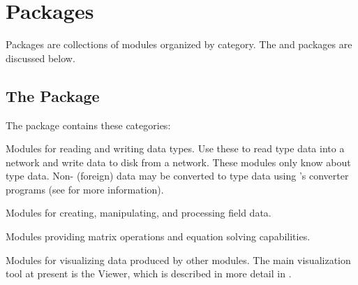 %
%
%
%
%
%

\section{Packages}
\label{sec:packages}

Packages are collections of modules organized by category. The \SR{} and 
packages are discussed below. 

\subsection{The \sr{} Package}
\label{sec:srpackage}


The \sr{} package contains these categories:

\begin{description}
   Modules for reading and writing \sr{}
  data types.  Use these to read \sr{} type data into a network and
  write data to disk from a network.  These modules only know about
  \sr{} type data.  Non-\sr{} (foreign) data may be converted to \sr{}
  type data using \sr{}'s converter programs (see  for more information).
  
   Modules for creating, manipulating, and
  processing field data.
  
   Modules providing matrix operations and
  equation solving capabilities.
  
   Modules for visualizing data produced by
  other modules.  The main visualization tool at present
  is the Viewer, which is described in more detail in
  .
\end{description}

